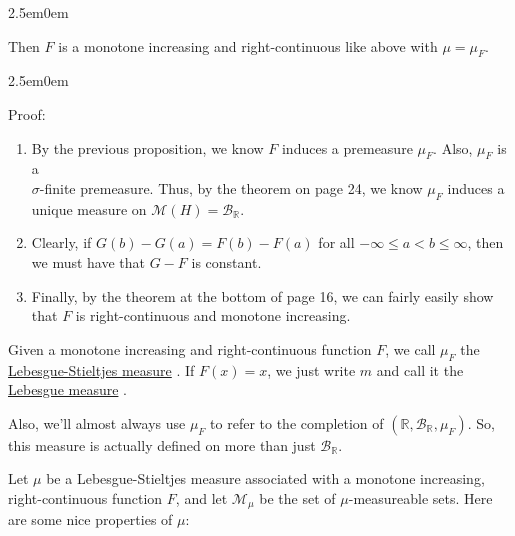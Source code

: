 \documentclass{book}
\newcommand{\hThree}{%
   \color{PineGreen!85!Orange}
   \fontsize{12}{14}\selectfont%
}
\newenvironment{myIndent}{%
   \begin{adjustwidth}{2.5em}{0em}%
}{%
   \end{adjustwidth}%
}
\newcommand{\udefine}[1]{{%
   \setulcolor{Red}%
   \setul{0.14em}{0.07em}%
   \ul{#1}%
}}
\newcommand{\retTwo}{\hfill\bigbreak}
\begin{document}
\begin{myIndent}
\begin{enumerate}
      Then $F$ is a monotone increasing and right-continuous like above with $\mu = \mu_F$.
   \end{enumerate}
   
   \begin{myIndent}\hThree
      Proof:
      \begin{enumerate}
         \item By the previous proposition, we know $F$ induces a premeasure $\mu_F$. Also, $\mu_F$ is a\\ $\sigma$-finite premeasure. Thus, by the theorem on page 24, we know $\mu_F$ induces a unique measure on $\mathcal{M}(H) = \mathcal{B}_{\mathbb{R}}$.\retTwo
   
         \item Clearly, if $G(b) - G(a) = F(b) - F(a)$ for all $-\infty \leq a < b \leq \infty$, then we must have that $G - F$ is constant.\retTwo
   
         \item Finally, by the theorem at the bottom of page 16, we can fairly easily show that $F$ is right-continuous and monotone increasing.\retTwo
      \end{enumerate}
   \end{myIndent}
\end{myIndent}

Given a monotone increasing and right-continuous function $F$, we call $\mu_F$ the\\ \udefine{Lebesgue-Stieltjes measure}. If $F(x) = x$, we just write $m$ and call it the\\ \udefine{Lebesgue measure}.\retTwo

Also, we'll almost always use $\mu_F$ to refer to the completion of $(\mathbb{R}, \mathcal{B}_{\mathbb{R}}, \mu_F)$. So, this measure is actually defined on more than just $\mathcal{B}_{\mathbb{R}}$.\newpage

Let $\mu$ be a Lebesgue-Stieltjes measure associated with a monotone increasing, right-continuous function $F$, and let $\mathcal{M}_{\mu}$ be the set of $\mu$-measureable sets. Here are some nice properties of $\mu$:
\end{document}
